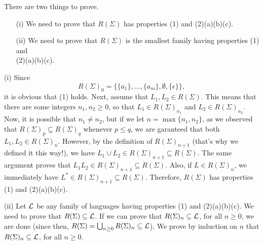 \proof
There are two things to prove. 
\begin{enumerate}
\item[(i)]
We need to prove
that $R(\Sigma)$ has properties (1) and (2)(a)(b)(c).
\item[(ii)]
We need to prove that $R(\Sigma)$ is the smallest
family having  properties (1) and \\
(2)(a)(b)(c).
\end{enumerate}

\medskip
(i) Since
\[
R(\Sigma)_0 =  \{\{a_1\}, \ldots, \{a_m\}, \emptyset, \{\epsilon\}\},
\]
it is obvious that (1) holds.
Next, assume that $L_1, L_2\in R(\Sigma)$.
This means that there are some integers $n_1, n_2\geq 0$,
so that $L_1\in R(\Sigma)_{n_1}$ and
$L_2\in R(\Sigma)_{n_2}$. Now, it is possible that 
$n_1 \not= n_2$, but if we let $n = \max\{n_1, n_2\}$,
as we observed that $R(\Sigma)_p \subseteq R(\Sigma)_q$
whenever $p \leq q$, we are garanteed that 
both $L_1, L_2\in R(\Sigma)_n$.
However, by the definition of $R(\Sigma)_{n+1}$
(that's why we defined it this way!), we have 
$L_1\cup L_2 \in R(\Sigma)_{n+1} \subseteq R(\Sigma)$.
The same argument proves that 
$L_1 L_2 \in R(\Sigma)_{n+1} \subseteq R(\Sigma)$.
Also, if $L\in R(\Sigma)_n$, we immediately have
$L^*\in R(\Sigma)_{n+1} \subseteq R(\Sigma)$.
Therefore, $R(\Sigma)$  has properties (1) and (2)(a)(b)(c).

\medskip
(ii)
Let ${\cal L}$ be any family of languages having
properties (1) and (2)(a)(b)(c). We need to prove that
$R(\Sigma) \subseteq {\cal L}$. If we can prove
that $R(\Sigma)_n \subseteq {\cal L}$, for all $n \geq 0$,
we are done (since then,
$R(\Sigma) = \bigcup_{n\geq 0} R(\Sigma)_{n} \subseteq {\cal L}$).
We prove by induction on $n$ that 
$R(\Sigma)_n \subseteq {\cal L}$, for all $n \geq 0$.

